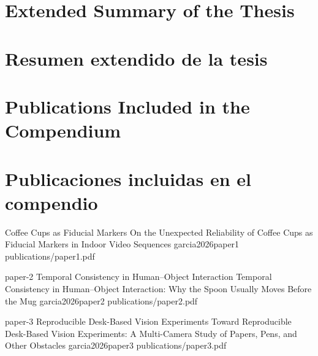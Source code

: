 %

  {\part{Extended Summary of the Thesis}}
  {\part{Resumen extendido de la tesis}}
\label{part:compendium-summary}










  {\part{Publications Included in the Compendium}}
  {\part{Publicaciones incluidas en el compendio}}
\label{part:compendium-publications}

 {Coffee Cups as Fiducial Markers}
 {On the Unexpected Reliability of Coffee Cups as Fiducial Markers in Indoor Video Sequences}
 {garcia2026paper1}
 {publications/paper1.pdf}

 {paper-2}
 {Temporal Consistency in Human--Object Interaction}
 {Temporal Consistency in Human--Object Interaction: Why the Spoon Usually Moves Before the Mug}
 {garcia2026paper2}
 {publications/paper2.pdf}

 {paper-3}
 {Reproducible Desk-Based Vision Experiments}
 {Toward Reproducible Desk-Based Vision Experiments: A Multi-Camera Study of Papers, Pens, and Other Obstacles}
 {garcia2026paper3}
 {publications/paper3.pdf}








